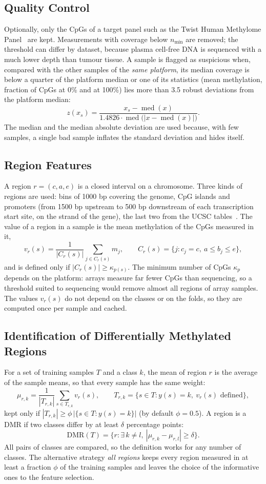 \documentclass[runningheads]{llncs}
\begin{document}
\subsection{Quality Control}
Optionally, only the CpGs of a target panel such as the Twist Human Methylome Panel~\cite{twist2025} are kept. Measurements with coverage below $n_{\min}$ are removed; the threshold can differ by dataset, because plasma cell-free DNA is sequenced with a much lower depth than tumour tissue. A sample is flagged as suspicious when, compared with the other samples of the \emph{same platform}, its median coverage is below a quarter of the platform median or one of its statistics (mean methylation, fraction of CpGs at 0\% and at 100\%) lies more than 3.5 robust deviations from the platform median:
\[
z(x_s)=\frac{x_s-\operatorname{med}(x)}{1.4826\cdot\operatorname{med}\bigl(|x-\operatorname{med}(x)|\bigr)}.
\]
The median and the median absolute deviation are used because, with few samples, a single bad sample inflates the standard deviation and hides itself.

\subsection{Region Features}
A region $r=(c,a,e)$ is a closed interval on a chromosome. Three kinds of regions are used: bins of 1000 bp covering the genome, CpG islands and promoters (from 1500 bp upstream to 500 bp downstream of each transcription start site, on the strand of the gene), the last two from the UCSC tables~\cite{kent2002}. The value of a region in a sample is the mean methylation of the CpGs measured in it,
\[
v_r(s)=\frac{1}{|C_r(s)|}\sum_{j\in C_r(s)} m_j,\qquad C_r(s)=\{j: c_j=c,\ a\leq b_j\leq e\},
\]
and is defined only if $|C_r(s)|\geq \kappa_{p(s)}$. The minimum number of CpGs $\kappa_p$ depends on the platform: arrays measure far fewer CpGs than sequencing, so a threshold suited to sequencing would remove almost all regions of array samples. The values $v_r(s)$ do not depend on the classes or on the folds, so they are computed once per sample and cached.

\subsection{Identification of Differentially Methylated Regions}
For a set of training samples $T$ and a class $k$, the mean of region $r$ is the average of the sample means, so that every sample has the same weight:
\[
\mu_{r,k}=\frac{1}{|T_{r,k}|}\sum_{s\in T_{r,k}} v_r(s),\qquad T_{r,k}=\{s\in T: y(s)=k,\ v_r(s)\text{ defined}\},
\]
kept only if $|T_{r,k}|\geq \phi\,|\{s\in T: y(s)=k\}|$ (by default $\phi=0.5$). A region is a DMR if two classes differ by at least $\delta$ percentage points:
\[
\mathrm{DMR}(T)=\{r: \exists\, k\neq l,\ |\mu_{r,k}-\mu_{r,l}|\geq\delta\}.
\]
All pairs of classes are compared, so the definition works for any number of classes. The alternative strategy \emph{all regions} keeps every region measured in at least a fraction $\phi$ of the training samples and leaves the choice of the informative ones to the feature selection.
\end{document}
